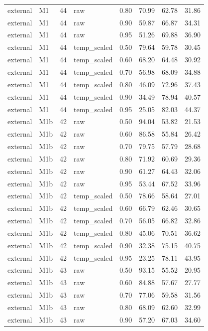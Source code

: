 \begin{tabular}{llrlrrrr}
external & M1 & 44 & raw & 0.80 & 70.99 & 62.78 & 31.86 \\
external & M1 & 44 & raw & 0.90 & 59.87 & 66.87 & 34.31 \\
external & M1 & 44 & raw & 0.95 & 51.26 & 69.88 & 36.90 \\
external & M1 & 44 & temp\_scaled & 0.50 & 79.64 & 59.78 & 30.45 \\
external & M1 & 44 & temp\_scaled & 0.60 & 68.20 & 64.48 & 30.92 \\
external & M1 & 44 & temp\_scaled & 0.70 & 56.98 & 68.09 & 34.88 \\
external & M1 & 44 & temp\_scaled & 0.80 & 46.09 & 72.96 & 37.43 \\
external & M1 & 44 & temp\_scaled & 0.90 & 34.49 & 78.94 & 40.57 \\
external & M1 & 44 & temp\_scaled & 0.95 & 25.05 & 82.03 & 44.37 \\
external & M1b & 42 & raw & 0.50 & 94.04 & 53.82 & 21.53 \\
external & M1b & 42 & raw & 0.60 & 86.58 & 55.84 & 26.42 \\
external & M1b & 42 & raw & 0.70 & 79.75 & 57.79 & 28.68 \\
external & M1b & 42 & raw & 0.80 & 71.92 & 60.69 & 29.36 \\
external & M1b & 42 & raw & 0.90 & 61.27 & 64.43 & 32.06 \\
external & M1b & 42 & raw & 0.95 & 53.44 & 67.52 & 33.96 \\
external & M1b & 42 & temp\_scaled & 0.50 & 78.66 & 58.64 & 27.01 \\
external & M1b & 42 & temp\_scaled & 0.60 & 66.79 & 62.46 & 30.65 \\
external & M1b & 42 & temp\_scaled & 0.70 & 56.05 & 66.82 & 32.86 \\
external & M1b & 42 & temp\_scaled & 0.80 & 45.06 & 70.51 & 36.62 \\
external & M1b & 42 & temp\_scaled & 0.90 & 32.38 & 75.15 & 40.75 \\
external & M1b & 42 & temp\_scaled & 0.95 & 23.25 & 78.11 & 43.95 \\
external & M1b & 43 & raw & 0.50 & 93.15 & 55.52 & 20.95 \\
external & M1b & 43 & raw & 0.60 & 84.88 & 57.67 & 27.77 \\
external & M1b & 43 & raw & 0.70 & 77.06 & 59.58 & 31.56 \\
external & M1b & 43 & raw & 0.80 & 68.09 & 62.60 & 32.99 \\
external & M1b & 43 & raw & 0.90 & 57.20 & 67.03 & 34.60 \\

\end{tabular}
